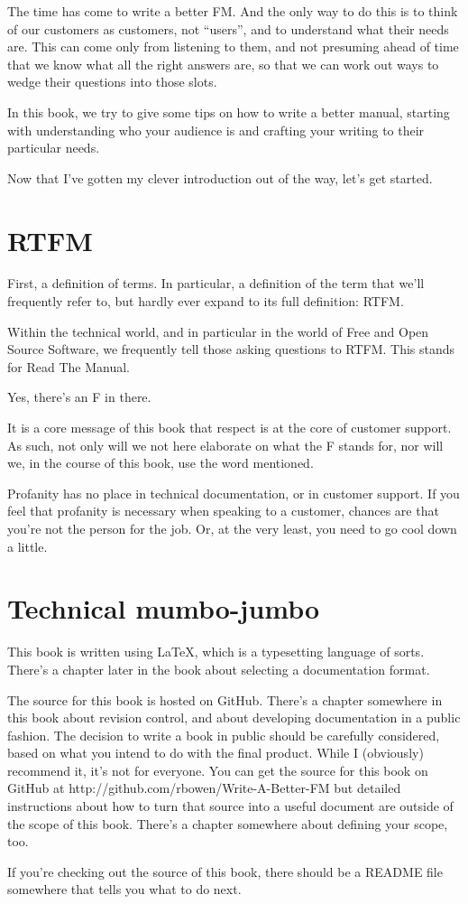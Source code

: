 The time has come to write a better FM. And the only way to do this is
to think of our customers as customers, not ``users'', and to understand
what their needs are. This can come only from listening to them, and not
presuming ahead of time that we know what all the right answers are, so
that we can work out ways to wedge their questions into those slots.

In this book, we try to give some tips on how to write a better manual,
starting with understanding who your audience is and crafting your
writing to their particular needs.

Now that I've gotten my clever introduction out of the way, let's get
started.

\section{RTFM}

First, a definition of terms. In particular, a definition of the term
that we'll frequently refer to, but hardly ever expand to its full
definition: RTFM.

Within the technical world, and in particular in the world of Free and
Open Source Software, we frequently tell those asking questions to RTFM.
This stands for Read The Manual.

Yes, there's an F in there.

It is a core message of this book that respect is at the core of
customer support. As such, not only will we not here elaborate on what
the F stands for, nor will we, in the course of this book, use the word
mentioned.

Profanity has no place in technical documentation, or in customer
support. If you feel that profanity is necessary when speaking to a
customer, chances are that you're not the person for the job. Or, at the
very least, you need to go cool down a little.

\section{Technical mumbo-jumbo}

This book is written using LaTeX, which is a typesetting language of
sorts. There's a chapter later in the book about selecting a
documentation format.

The source for this book is hosted on GitHub. There's a chapter
somewhere in this book about revision control, and about developing
documentation in a public fashion. The decision to write a book in
public should be carefully considered, based on what you intend to do
with the final product. While I (obviously) recommend it, it's not for
everyone. You can get the source for this book on GitHub at
http://github.com/rbowen/Write-A-Better-FM but detailed instructions
about how to turn that source into a useful document are outside of the
scope of this book. There's a chapter somewhere about defining your
scope, too.

If you're checking out the source of this book, there should be a README
file somewhere that tells you what to do next.

